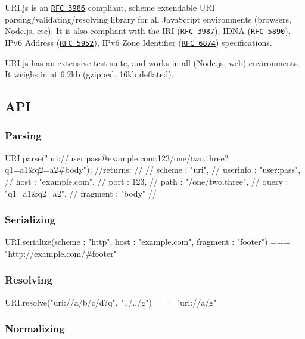 U\+R\+I.\+js is an \href{http://www.ietf.org/rfc/rfc3986.txt}{\tt R\+FC 3986} compliant, scheme extendable U\+RI parsing/validating/resolving library for all Java\+Script environments (browsers, Node.\+js, etc). It is also compliant with the I\+RI (\href{http://www.ietf.org/rfc/rfc3987.txt}{\tt R\+FC 3987}), I\+D\+NA (\href{http://www.ietf.org/rfc/rfc5890.txt}{\tt R\+FC 5890}), I\+Pv6 Address (\href{http://www.ietf.org/rfc/rfc5952.txt}{\tt R\+FC 5952}), I\+Pv6 Zone Identifier (\href{http://www.ietf.org/rfc/rfc6874.txt}{\tt R\+FC 6874}) specifications.

U\+R\+I.\+js has an extensive test suite, and works in all (Node.\+js, web) environments. It weighs in at 6.\+2kb (gzipped, 16kb deflated).

\subsection*{A\+PI}

\subsubsection*{Parsing}

\begin{DoxyVerb}URI.parse("uri://user:pass@example.com:123/one/two.three?q1=a1&q2=a2#body");
//returns:
//{
//  scheme : "uri",
//  userinfo : "user:pass",
//  host : "example.com",
//  port : 123,
//  path : "/one/two.three",
//  query : "q1=a1&q2=a2",
//  fragment : "body"
//}
\end{DoxyVerb}


\subsubsection*{Serializing}

\begin{DoxyVerb}URI.serialize({scheme : "http", host : "example.com", fragment : "footer"}) === "http://example.com/#footer"
\end{DoxyVerb}


\subsubsection*{Resolving}

\begin{DoxyVerb}URI.resolve("uri://a/b/c/d?q", "../../g") === "uri://a/g"
\end{DoxyVerb}


\subsubsection*{Normalizing}

